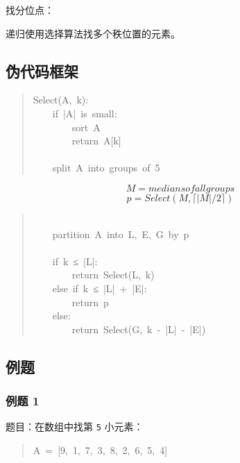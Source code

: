 \documentclass[UTF8,zihao=-4]{ctexart}
\begin{document}
找分位点：

递归使用选择算法找多个秩位置的元素。

\subsection*{伪代码框架}

\begin{quote}
\small\ttfamily\raggedright
\relax Select(A,\ k):\\
\relax \ \ \ \ if\ |A|\ is\ small:\\
\relax \ \ \ \ \ \ \ \ sort\ A\\
\relax \ \ \ \ \ \ \ \ return\ A[k]\\
\mbox{}\\
\relax \ \ \ \ split\ A\ into\ groups\ of\ 5\\
\end{quote}
\[M = medians of all groups\]
\[p = Select(M, \lceil |M| / 2 \rceil)\]
\begin{quote}
\small\ttfamily\raggedright
\mbox{}\\
\relax \ \ \ \ partition\ A\ into\ L,\ E,\ G\ by\ p\\
\mbox{}\\
\relax \ \ \ \ if\ k\ ≤\ |L|:\\
\relax \ \ \ \ \ \ \ \ return\ Select(L,\ k)\\
\relax \ \ \ \ else\ if\ k\ ≤\ |L|\ +\ |E|:\\
\relax \ \ \ \ \ \ \ \ return\ p\\
\relax \ \ \ \ else:\\
\relax \ \ \ \ \ \ \ \ return\ Select(G,\ k\ -\ |L|\ -\ |E|)\\
\end{quote}

\subsection*{例题}

\subsubsection*{例题 1}

题目：在数组中找第 \texttt{5} 小元素：

\begin{quote}
\small\ttfamily\raggedright
\relax A\ =\ [9,\ 1,\ 7,\ 3,\ 8,\ 2,\ 6,\ 5,\ 4]\\
\end{quote}
\end{document}
